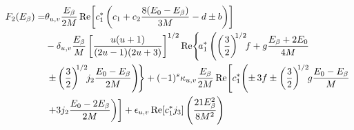 %
%
%
\begin{align}
F_2(\Ee) = &
\thetauv \frac{\Ee}{2M} 
\Re\left[
	c_1^*\left(
		c_1 + c_2 \frac{8(E_0-\Ee)}{3M}
		-d \pm b
	\right)
\right]
\nonumber \\ &
- \deltauv \frac{\Ee}{M} 
\left[ \frac{u(u+1)}{(2u-1)(2u+3)} \right]^{1/2} \!
\Re \left\{ \!
	a_1^*\left( 
		\left( \frac{3}{2} \right)^{\!\!1/2}\!\! f
		+ g \frac{\Ee+2E_0}{4M} 
		\right.\right.
		\nonumber \\ &
		\left.\left.
		\pm \left( \frac{3}{2} \right)^{\!\!1/2}\!\! j_2 \frac{E_0-\E}{2M}
	\right) \!
\right\}
+ (-1)^s \kappauv \frac{\E}{2M}
\Re \left[
	c_1^* \! \left(
		\pm \, 3 f 
		\pm \left( \frac{3}{2} \right)^{\!\!1/2}\!\! g \frac{E_0-\Ee}{M}
		\right.\right.
		\nonumber \\ &
		\left.\left.
		+ 3 j_2 \frac{E_0-2\Ee}{2M}
	\right)
\right]
+ \epsilonuv \Re\left[ c_1^* j_3 \right]
\left( 
	\frac{21 \E^2}{8 M^2}
\right)
\end{align}
%